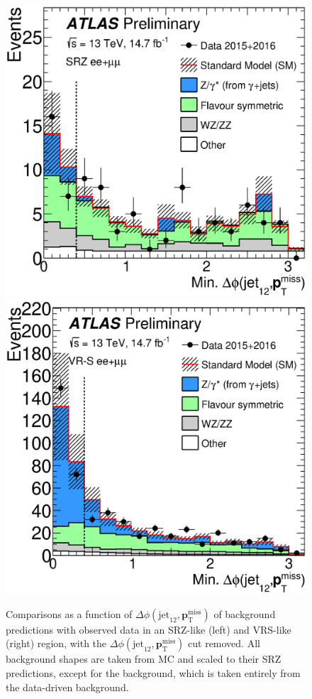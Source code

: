 \begin{centering}
\begin{figure}[!hbt]
\myfloatalign
\includegraphics[width=.9\linewidth]{figures/results/dPhi_azmet_ee+mm_onz_SR.eps}
\includegraphics[width=.9\linewidth]{figures/results/dPhi_azmet_ee+mm_onz_VR.eps}
\caption{Comparisons as a function of $\Delta\phi(\text{jet}_{12},{\boldsymbol p}_{\mathrm{T}}^\mathrm{miss})$ of background predictions with observed data in an SRZ-like (left) and VRS-like (right) region, with the $\Delta\phi(\text{jet}_{12},{\boldsymbol p}_{\mathrm{T}}^\mathrm{miss})$ cut removed. All background shapes are taken from \ac{MC} and scaled to their SRZ predictions, except for the \dyjets background, which is taken entirely from the data-driven background.}
\label{fig:results_dphi}
\end{figure}
\end{centering}

